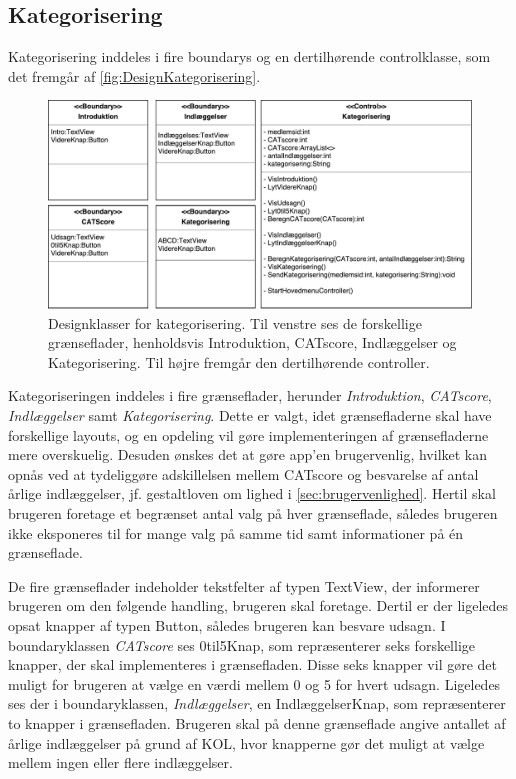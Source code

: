 \subsection*{Kategorisering}
Kategorisering inddeles i fire boundarys og en dertilhørende controlklasse, som det fremgår af \autoref{fig:DesignKategorisering}.

\begin{figure} [H]
\centering
\includegraphics[width=1\textwidth]{figures/MVC/MVCKategorisering}
\caption{Designklasser for kategorisering. Til venstre ses de forskellige grænseflader, henholdsvis Introduktion, CATscore, Indlæggelser og Kategorisering. Til højre fremgår den dertilhørende controller.}
\label{fig:DesignKategorisering}
\end{figure}

\noindent
Kategoriseringen inddeles i fire grænseflader, herunder \textit{Introduktion}, \textit{CATscore}, \textit{Indlæggelser} samt \textit{Kategorisering}. Dette er valgt, idet grænsefladerne skal have forskellige layouts, og en opdeling vil gøre implementeringen af grænsefladerne mere overskuelig. Desuden ønskes det at gøre app’en brugervenlig, hvilket kan opnås ved at tydeliggøre adskillelsen mellem CATscore og besvarelse af antal årlige indlæggelser, jf. gestaltloven om lighed i \autoref{sec:brugervenlighed}. Hertil skal brugeren foretage et begrænset antal valg på hver grænseflade, således
brugeren ikke eksponeres til for mange valg på samme tid samt informationer på én grænseflade.

De fire grænseflader indeholder tekstfelter af typen TextView, der informerer brugeren om den følgende handling, brugeren skal foretage. Dertil er der ligeledes opsat knapper af typen Button, således brugeren kan besvare udsagn. I boundaryklassen \textit{CATscore} ses 0til5Knap, som repræsenterer seks forskellige knapper, der skal implementeres i grænsefladen. Disse seks knapper vil gøre det muligt for brugeren at vælge en værdi mellem 0 og 5 for hvert udsagn. Ligeledes ses der i boundaryklassen, \textit{Indlæggelser}, en IndlæggelserKnap, som repræsenterer to knapper i grænsefladen. Brugeren skal på denne grænseflade angive antallet af årlige indlæggelser på grund af KOL, hvor knapperne gør det muligt at vælge mellem ingen eller flere indlæggelser.

